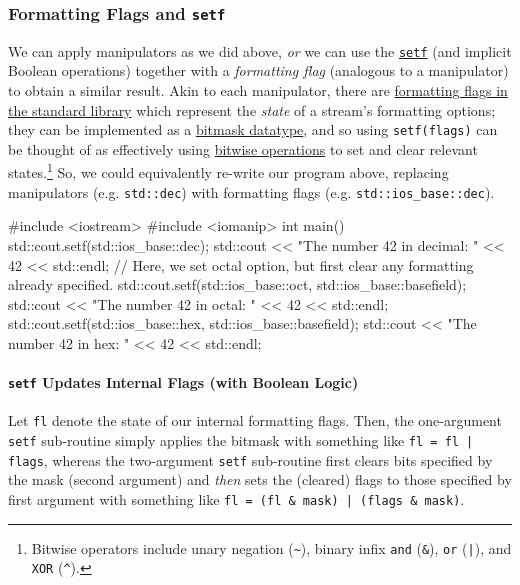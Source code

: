 \documentclass[12pt,letterpaper,twoside]{article}
\begin{document}
\subsubsection{Formatting Flags and \texttt{setf}} 
We can apply manipulators as we did above, \emph{or} 
we can use the \href{https://en.cppreference.com/w/cpp/io/ios_base/setf}{\texttt{setf}} 
(and implicit Boolean operations) together with a \emph{formatting flag} (analogous to a manipulator)
 to obtain a similar result. 
Akin to each manipulator, there are \href{https://en.cppreference.com/w/cpp/io/ios_base/fmtflags}
{formatting flags in the standard library} which represent the \emph{state} of a stream's formatting options; they can be implemented as a 
\href{https://en.cppreference.com/w/cpp/named_req/BitmaskType}{bitmask datatype}, and so 
using \texttt{setf(flags)} can be thought of as effectively using 
\href{https://en.cppreference.com/w/cpp/language/operator_arithmetic#Bitwise_logic_operators}{bitwise operations} to 
set and clear relevant states.\footnote{Bitwise operators include unary negation (\texttt{\~}), binary infix \texttt{and} (\texttt{\&}), \texttt{or} (\texttt{|}), and 
\texttt{XOR} (\texttt{\^}).} So, we could equivalently re-write our program above, 
replacing manipulators (e.g. \texttt{std::dec})
with  formatting flags (e.g. \texttt{std::ios\_base::dec}).

\begin{cpp}
#include <iostream>
#include <iomanip>
 int main() {
    std::cout.setf(std::ios_base::dec);
    std::cout << "The number 42 in decimal: " << 42 << std::endl;
    // Here, we set octal option, but first clear any formatting already specified.
    std::cout.setf(std::ios_base::oct, std::ios_base::basefield);
    std::cout << "The number 42 in octal:   " << 42 << std::endl;
    std::cout.setf(std::ios_base::hex, std::ios_base::basefield);
    std::cout << "The number 42 in hex:     " << 42 << std::endl;
} \end{cpp}

\paragraph{\texttt{setf} Updates Internal Flags (with Boolean Logic)}
Let \texttt{fl} denote the state of our internal formatting flags.
Then, the one-argument \texttt{setf} sub-routine simply applies the 
bitmask with something like
\texttt{fl = fl | flags}, whereas the two-argument \texttt{setf} 
sub-routine first clears bits specified by the mask (second argument) 
and \emph{then} sets the (cleared) flags to those specified by first argument
 with something like \newline
\texttt{fl = (fl \& \tilde mask) | (flags \& mask)}.
\end{document}
